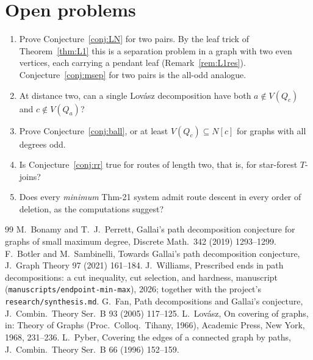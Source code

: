 \documentclass[11pt]{amsart}
\theoremstyle{definition}
\begin{document}
\section{Open problems}\label{sec:open}
\begin{enumerate}
\item Prove Conjecture~\ref{conj:LN} for two pairs. By the leaf trick of Theorem~\ref{thm:L1} this is
a separation problem in a graph with two even vertices, each carrying a pendant leaf
(Remark~\ref{rem:L1res}). Conjecture~\ref{conj:msep} for two pairs is the all-odd analogue.
\item At distance two, can a single Lov\'asz decomposition have both $a\notin V(Q_c)$ and
$c\notin V(Q_a)$?
\item Prove Conjecture~\ref{conj:ball}, or at least $V(Q_c)\subseteq N[c]$ for graphs with all
degrees odd.
\item Is Conjecture~\ref{conj:rr} true for routes of length two, that is, for star-forest $T$-joins?
\item Does every \emph{minimum} Thm-21 system admit route descent in every order of deletion, as the
computations suggest?
\end{enumerate}

\begin{thebibliography}{99}
 M.~Bonamy and T.~J.~Perrett, Gallai's path decomposition conjecture for graphs of small
maximum degree, Discrete Math.\ 342 (2019) 1293--1299.
 F.~Botler and M.~Sambinelli, Towards Gallai's path decomposition conjecture, J.~Graph
Theory 97 (2021) 161--184.
 J.~Williams, Prescribed ends in path decompositions: a cut inequality, cut selection, and
hardness, manuscript (\texttt{manuscripts/endpoint-min-max}), 2026; together with the project's
\texttt{research/synthesis.md}.
 G.~Fan, Path decompositions and Gallai's conjecture, J.~Combin.\ Theory Ser.~B 93 (2005)
117--125.
 L.~Lov\'asz, On covering of graphs, in: Theory of Graphs (Proc.\ Colloq.\ Tihany, 1966),
Academic Press, New York, 1968, 231--236.
 L.~Pyber, Covering the edges of a connected graph by paths, J.~Combin.\ Theory Ser.~B 66
(1996) 152--159.
\end{thebibliography}
\end{document}
